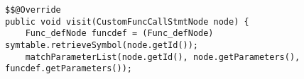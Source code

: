 \begin{lstlisting}[caption={Visit method for CustomFuncCallStmtNode in FuncStructureVisitor}, label={customFuncCall}]
$$@Override
public void visit(CustomFuncCallStmtNode node) {
    Func_defNode funcdef = (Func_defNode) symtable.retrieveSymbol(node.getId());
    matchParameterList(node.getId(), node.getParameters(), funcdef.getParameters());
\end{lstlisting}